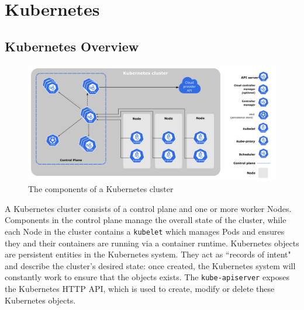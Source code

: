 \section{Kubernetes}

\subsection{Kubernetes Overview}

\begin{figure}[ht]
    \centering
    \includegraphics[width=\textwidth]{images/components-of-kubernetes.pdf}
    \caption{The components of a Kubernetes cluster~\cite{kubernetes-components}}
    \label{kube-components}
\end{figure}

A Kubernetes cluster consists of a control plane and one or more worker Nodes.
Components in the control plane manage the overall state of the cluster, while
each Node in the cluster contains a \verb|kubelet| which manages Pods and
ensures they and their containers are running via a container runtime.
Kubernetes objects are persistent entities in the Kubernetes system. They act as
``records of intent" and describe the cluster's desired state: once created, the
Kubernetes system will constantly work to ensure that the objects exists. The
\verb|kube-apiserver| exposes the Kubernetes HTTP API, which is used to create,
modify or delete these Kubernetes objects.

